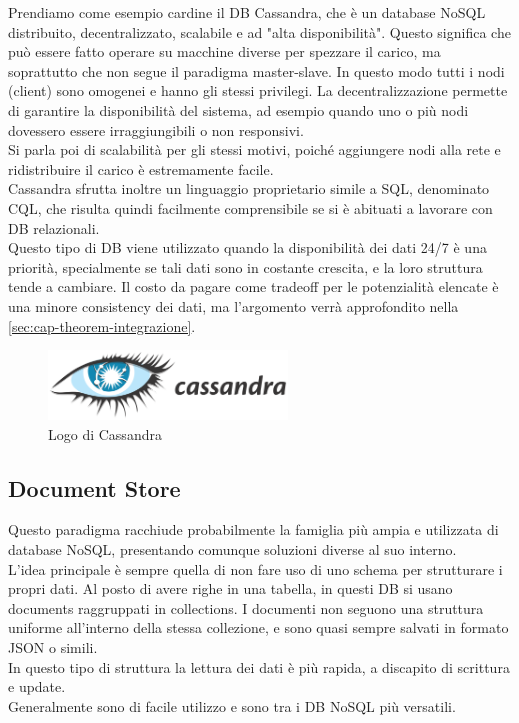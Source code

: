 \noindent Prendiamo come esempio cardine il DB Cassandra, che è un database NoSQL distribuito, decentralizzato, scalabile e ad "alta disponibilità". Questo significa che può essere fatto operare su macchine diverse per spezzare il carico, ma soprattutto che non segue il paradigma master-slave. In questo modo tutti i nodi (client) sono omogenei e hanno gli stessi privilegi. La decentralizzazione permette di garantire la disponibilità del sistema, ad esempio quando uno o più nodi dovessero essere irraggiungibili o non responsivi.\\
Si parla poi di scalabilità per gli stessi motivi, poiché aggiungere nodi alla rete e ridistribuire il carico è estremamente facile.\\
Cassandra sfrutta inoltre un linguaggio proprietario simile a SQL, denominato CQL, che risulta quindi facilmente comprensibile se si è abituati a lavorare con DB relazionali.\\

\noindent Questo tipo di DB viene utilizzato quando la disponibilità dei dati 24/7 è una priorità, specialmente se tali dati sono in costante crescita, e la loro struttura tende a cambiare. Il costo da pagare come tradeoff per le potenzialità elencate è una minore consistency dei dati, ma l'argomento verrà approfondito nella \autoref{sec:cap-theorem-integrazione}.

\begin{figure}[htbp]
\begin{center}
\includegraphics[height=5em]{immagini/tecnologies-logos/Cassandra-Logo-h.png}
\caption{Logo di Cassandra}
\end{center}
\end{figure}

\subsection{Document Store}
Questo paradigma racchiude probabilmente la famiglia più ampia e utilizzata di database NoSQL, presentando comunque soluzioni diverse al suo interno.\\
L'idea principale è sempre quella di non fare uso di uno schema per strutturare i propri dati. Al posto di avere righe in una tabella, in questi DB si usano documents raggruppati in collections. I documenti non seguono una struttura uniforme all'interno della stessa collezione, e sono quasi sempre salvati in formato JSON o simili.\\
In questo tipo di struttura la lettura dei dati è più rapida, a discapito di scrittura e update.\\
Generalmente sono di facile utilizzo e sono tra i DB NoSQL più versatili.\\

